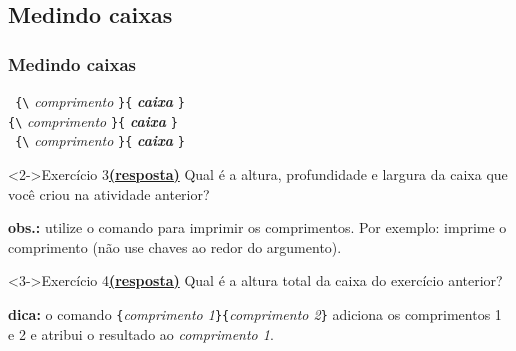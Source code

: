 \documentclass[handout,10pt]{beamer}
\begin{document}
\subsection{Medindo caixas}
\begin{frame}[fragile]
	\frametitle{Medindo caixas}
	
	\begin{block}{}
		\verb| {\|%
			\textit{comprimento}%
		\verb|}{|%
			\textit{\textbf{caixa}}%
		\verb|}|\\
		\verb|{\|%
			\textit{comprimento}%
		\verb|}{|%
			\textit{\textbf{caixa}}%
		\verb|}|\\
		\verb| {\|%
			\textit{comprimento}%
		\verb|}{|%
			\textit{\textbf{caixa}}%
		\verb|}|
	\end{block}
	
	\begin{block}<2->{Exercício 3\hyperlink{respostas}{\footnotesize\textbf{(resposta)}}}
		Qual é a altura, profundidade e largura da caixa que você criou na atividade anterior?
		
		\medskip
		\footnotesize
		\textbf{obs.:} utilize o comando  para imprimir os comprimentos. Por exemplo:  imprime o comprimento  (não use chaves ao redor do argumento).
	\end{block}
	
	\begin{block}<3->{Exercício 4\hyperlink{respostas}{\footnotesize\textbf{(resposta)}}}
		Qual é a altura total da caixa do exercício anterior?
		
		\medskip
		\footnotesize
		\textbf{dica:} o comando \verb|{|\textit{comprimento 
		1}\verb|}{|\textit{comprimento 2}\verb|}| adiciona os comprimentos
		1 e 2 e atribui o resultado ao \textit{comprimento 1}.
	\end{block}
	
\end{frame}
\end{document}
